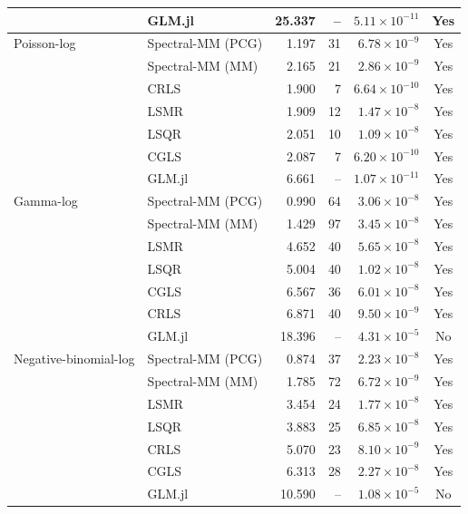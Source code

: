 \begin{table}[htbp]
\begin{tabular}{llrrrc}
 & GLM.jl & 25.337 & -- & $5.11\times10^{-11}$ & Yes \\
\midrule
Poisson-log & Spectral-MM (PCG) & 1.197 & 31 & $6.78\times10^{-9}$ & Yes \\
 & Spectral-MM (MM) & 2.165 & 21 & $2.86\times10^{-9}$ & Yes \\
 & CRLS & 1.900 & 7 & $6.64\times10^{-10}$ & Yes \\
 & LSMR & 1.909 & 12 & $1.47\times10^{-8}$ & Yes \\
 & LSQR & 2.051 & 10 & $1.09\times10^{-8}$ & Yes \\
 & CGLS & 2.087 & 7 & $6.20\times10^{-10}$ & Yes \\
 & GLM.jl & 6.661 & -- & $1.07\times10^{-11}$ & Yes \\
\midrule
Gamma-log & Spectral-MM (PCG) & 0.990 & 64 & $3.06\times10^{-8}$ & Yes \\
 & Spectral-MM (MM) & 1.429 & 97 & $3.45\times10^{-8}$ & Yes \\
 & LSMR & 4.652 & 40 & $5.65\times10^{-8}$ & Yes \\
 & LSQR & 5.004 & 40 & $1.02\times10^{-8}$ & Yes \\
 & CGLS & 6.567 & 36 & $6.01\times10^{-8}$ & Yes \\
 & CRLS & 6.871 & 40 & $9.50\times10^{-9}$ & Yes \\
 & GLM.jl & 18.396 & -- & $4.31\times10^{-5}$ & No \\
\midrule
Negative-binomial-log & Spectral-MM (PCG) & 0.874 & 37 & $2.23\times10^{-8}$ & Yes \\
 & Spectral-MM (MM) & 1.785 & 72 & $6.72\times10^{-9}$ & Yes \\
 & LSMR & 3.454 & 24 & $1.77\times10^{-8}$ & Yes \\
 & LSQR & 3.883 & 25 & $6.85\times10^{-8}$ & Yes \\
 & CRLS & 5.070 & 23 & $8.10\times10^{-9}$ & Yes \\
 & CGLS & 6.313 & 28 & $2.27\times10^{-8}$ & Yes \\
 & GLM.jl & 10.590 & -- & $1.08\times10^{-5}$ & No \\
\bottomrule
\end{tabular}
\end{table}
